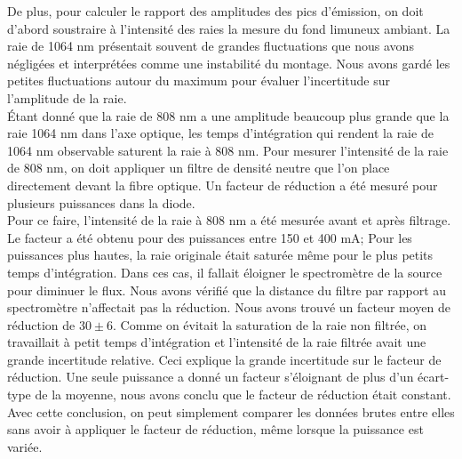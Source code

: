 \documentclass[10pt,letterpaper,twocolumn]{article}
\begin{document}
De plus, pour calculer le rapport des amplitudes des pics d'émission, on doit d'abord soustraire à l'intensité des raies la mesure du fond limuneux ambiant. La raie de 1064 nm présentait souvent de grandes fluctuations que nous avons négligées et interprétées comme une instabilité du montage. Nous avons gardé les petites fluctuations autour du maximum pour évaluer l'incertitude sur l'amplitude de la raie. \\ 

Étant donné que la raie de 808 nm a une amplitude beaucoup plus grande que la raie 1064 nm dans l'axe optique, les temps d'intégration qui rendent la raie de 1064 nm observable saturent la raie à 808 nm. Pour mesurer l'intensité de la raie de 808 nm, on doit appliquer un filtre de densité neutre que l'on place directement devant la fibre optique. Un facteur de réduction a été mesuré pour plusieurs puissances dans la diode. \\

Pour ce faire, l'intensité de la raie à 808 nm a été mesurée avant et après filtrage. Le facteur a été obtenu pour des puissances entre  150 et 400 mA; Pour les puissances plus hautes, la raie originale était saturée même pour le plus petits temps d'intégration.  Dans ces cas, il fallait éloigner le spectromètre  de la source pour diminuer le flux. Nous avons vérifié que la distance du filtre par rapport au spectromètre n'affectait pas la réduction. Nous avons trouvé un facteur moyen de réduction de $30 \pm 6$. %
Comme on évitait la saturation de la raie non filtrée, on travaillait à petit temps d'intégration et l'intensité de la raie filtrée avait une grande incertitude relative. Ceci explique la grande incertitude sur le facteur de réduction. Une seule puissance a donné un facteur s'éloignant de plus d'un écart-type de la moyenne, nous avons conclu que le facteur de réduction était constant. Avec cette conclusion, on peut simplement comparer les données brutes entre elles sans avoir à appliquer le facteur de réduction, même lorsque la puissance est variée.

\end{document}
